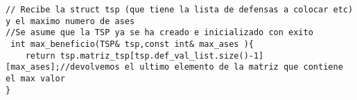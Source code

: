 \begin{lstlisting}
// Recibe la struct tsp (que tiene la lista de defensas a colocar etc) y el maximo numero de ases
//Se asume que la TSP ya se ha creado e inicializado con exito
 int max_beneficio(TSP& tsp,const int& max_ases ){
    return tsp.matriz_tsp[tsp.def_val_list.size()-1][max_ases];//devolvemos el ultimo elemento de la matriz que contiene el max valor
}
\end{lstlisting}